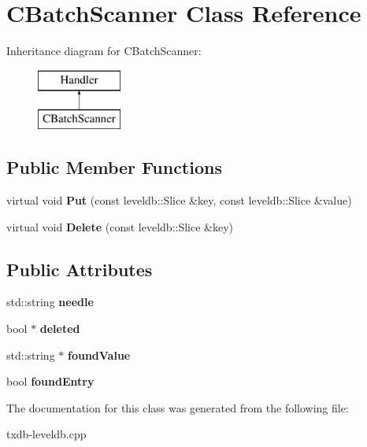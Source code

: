 \hypertarget{class_c_batch_scanner}{}\section{C\+Batch\+Scanner Class Reference}
\label{class_c_batch_scanner}
Inheritance diagram for C\+Batch\+Scanner\+:\begin{figure}[H]
\begin{center}
\leavevmode
\includegraphics[height=2.000000cm]{class_c_batch_scanner}
\end{center}
\end{figure}
\subsection*{Public Member Functions}
\begin{DoxyCompactItemize}
\item 
\mbox{\label{class_c_batch_scanner_ae993b8af4417559238d9d985975f9f09}} 
virtual void {\bfseries Put} (const leveldb\+::\+Slice \&key, const leveldb\+::\+Slice \&value)
\item 
\mbox{\label{class_c_batch_scanner_a5569f5c1c04cbdaa1e226895d9cdb51a}} 
virtual void {\bfseries Delete} (const leveldb\+::\+Slice \&key)
\end{DoxyCompactItemize}
\subsection*{Public Attributes}
\begin{DoxyCompactItemize}
\item 
\mbox{\label{class_c_batch_scanner_ae04f7151c91676f9f6209737cdc3d086}} 
std\+::string {\bfseries needle}
\item 
\mbox{\label{class_c_batch_scanner_afdb6e59a53fed441090c43750c3c2617}} 
bool $\ast$ {\bfseries deleted}
\item 
\mbox{\label{class_c_batch_scanner_a3a82f2f7068f469eb535435a0b9ae640}} 
std\+::string $\ast$ {\bfseries found\+Value}
\item 
\mbox{\label{class_c_batch_scanner_ad2669c1d3fbd8c206b1f42348dde8cf0}} 
bool {\bfseries found\+Entry}
\end{DoxyCompactItemize}


The documentation for this class was generated from the following file\+:\begin{DoxyCompactItemize}
\item 
txdb-\/leveldb.\+cpp\end{DoxyCompactItemize}
